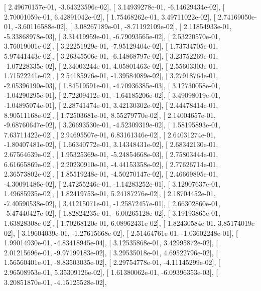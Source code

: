 \documentclass{article}
\begin{document}
       [  2.49670157e-01,  -3.64323596e-02],
       [  3.14939278e-01,  -6.14629434e-02],
       [  2.70001059e-01,   6.42891042e-02],
       [  1.75468262e-01,   3.49711022e-02],
       [  2.74169050e-01,  -3.60116588e-02],
       [  3.08267189e-01,  -8.71192109e-02],
       [  2.11854933e-01,  -5.33868978e-03],
       [  3.31419959e-01,  -6.79093565e-02],
       [  2.53220570e-01,   3.76019001e-02],
       [  3.22251929e-01,  -7.95129404e-02],
       [  1.73734705e-01,   5.97441443e-02],
       [  3.26345506e-01,  -6.14868797e-02],
       [  3.23752269e-01,  -1.07228335e-02],
       [  2.34003244e-01,   4.05801463e-02],
       [  2.55603303e-01,   1.71522241e-02],
       [  2.54185976e-01,  -1.39584089e-02],
       [  3.27918764e-01,  -2.05396190e-03],
       [  1.84519591e-01,  -4.70936385e-03],
       [  3.12730058e-01,  -1.04290295e-01],
       [  2.72209412e-01,  -1.64185206e-02],
       [  3.49098019e-01,  -1.04895074e-01],
       [  2.28741474e-01,   3.42130302e-02],
       [  2.44478414e-01,   8.90511168e-02],
       [  1.72503681e-01,   8.55279770e-02],
       [  2.14004657e-01,  -9.68760647e-02],
       [  3.26693530e-01,  -4.52309319e-02],
       [  1.58195893e-01,   7.63711422e-02],
       [  2.94695507e-01,   6.83161346e-02],
       [  2.64031274e-01,  -1.80407481e-02],
       [  1.66340772e-01,   3.14348431e-02],
       [  2.68342130e-01,   2.67564639e-02],
       [  1.95325369e-01,  -5.24854668e-03],
       [  2.75803444e-01,   6.61665869e-02],
       [  2.20230910e-01,  -4.44153358e-02],
       [  2.77626714e-01,   2.36573802e-02],
       [  1.85519248e-01,  -4.50270147e-02],
       [  2.46669895e-01,  -4.30091486e-02],
       [  2.47255246e-01,  -1.14283252e-01],
       [  3.12907637e-01,   1.49685935e-02],
       [  1.82419753e-01,   5.24187276e-02],
       [  2.18704452e-01,  -7.40590538e-02],
       [  3.41215071e-01,  -1.25872457e-01],
       [  2.66302860e-01,  -5.47440427e-02],
       [  1.82824235e-01,  -6.00265128e-02],
       [  3.19193865e-01,   1.63828308e-02],
       [  1.70268120e-01,   6.08962431e-02],
       [  1.82430584e-01,   3.85174019e-02],
       [  3.19604039e-01,  -1.27615668e-02],
       [  2.51464761e-01,  -1.03602248e-01],
       [  1.99014930e-01,  -4.83418945e-04],
       [  3.12535868e-01,   3.42995872e-02],
       [  2.01215696e-01,  -9.97199183e-02],
       [  3.29535018e-01,   4.69522796e-02],
       [  1.56560401e-01,  -8.83503035e-02],
       [  2.29754778e-01,  -4.11145299e-02],
       [  2.96508953e-01,   5.35309126e-02],
       [  1.61380062e-01,  -6.09396353e-03],
       [  3.20851870e-01,  -4.15125528e-02],
\end{document}
